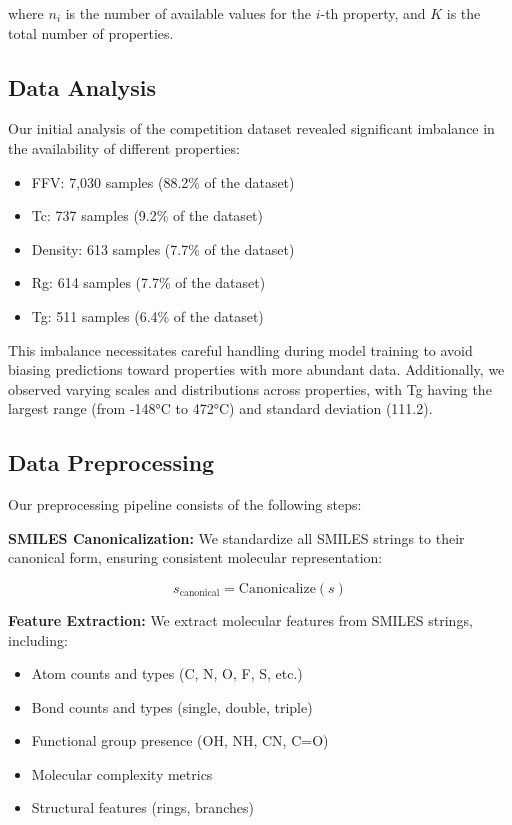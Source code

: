 \documentclass[10pt,twocolumn,letterpaper]{article}
\begin{document}
where $n_i$ is the number of available values for the $i$-th property, and $K$ is the total number of properties.

\subsection{Data Analysis}

Our initial analysis of the competition dataset revealed significant imbalance in the availability of different properties:

\begin{itemize}
    \item FFV: 7,030 samples (88.2\% of the dataset)
    \item Tc: 737 samples (9.2\% of the dataset)
    \item Density: 613 samples (7.7\% of the dataset)
    \item Rg: 614 samples (7.7\% of the dataset)
    \item Tg: 511 samples (6.4\% of the dataset)
\end{itemize}

This imbalance necessitates careful handling during model training to avoid biasing predictions toward properties with more abundant data. Additionally, we observed varying scales and distributions across properties, with Tg having the largest range (from -148°C to 472°C) and standard deviation (111.2).

\subsection{Data Preprocessing}

Our preprocessing pipeline consists of the following steps:

\textbf{SMILES Canonicalization:} We standardize all SMILES strings to their canonical form, ensuring consistent molecular representation:

\begin{equation}
s_{\text{canonical}} = \text{Canonicalize}(s)
\end{equation}

\textbf{Feature Extraction:} We extract molecular features from SMILES strings, including:
\begin{itemize}
    \item Atom counts and types (C, N, O, F, S, etc.)
    \item Bond counts and types (single, double, triple)
    \item Functional group presence (OH, NH, CN, C=O)
    \item Molecular complexity metrics
    \item Structural features (rings, branches)
\end{itemize}
\end{document}

